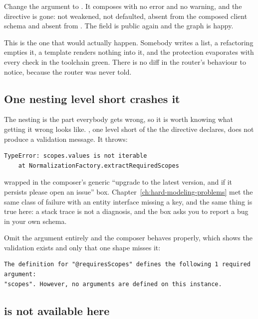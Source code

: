 %
Change the argument to . It composes with no error and no
warning, and the directive is gone: not weakened, not defaulted, absent from
the composed client schema and absent from . The
field is public again and the graph is happy.

This is the one that would actually happen. Somebody writes a list, a
refactoring empties it, a template renders nothing into it, and the protection
evaporates with every check in the toolchain green. There is no diff in the
router's behaviour to notice, because the router was never told.

\subsection*{One nesting level short crashes it}

%
The nesting is the part everybody gets wrong, so it is worth knowing what
getting it wrong looks like. , one level short of
the \code{[[Scope!]!]!} the directive declares, does not produce a validation
message. It throws:

\begin{verbatim}
TypeError: scopes.values is not iterable
    at NormalizationFactory.extractRequiredScopes
\end{verbatim}

wrapped in the composer's generic \enquote{upgrade to the latest version, and
if it persists please open an issue} box. Chapter~\ref{ch:hard-modeling-problems}
met the same class of failure with an entity interface missing a key, and the
same thing is true here: a stack trace is not a diagnosis, and the box asks you
to report a bug in your own schema.

Omit the argument entirely and the composer behaves properly, which shows the
validation exists and only that one shape misses it:

\begin{verbatim}
The definition for "@requiresScopes" defines the following 1 required argument:
"scopes". However, no arguments are defined on this instance.
\end{verbatim}

\subsection*{ is not available here}

